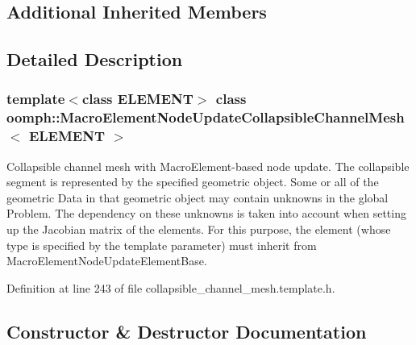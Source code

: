 \subsection*{Additional Inherited Members}


\subsection{Detailed Description}
\subsubsection*{template$<$class E\+L\+E\+M\+E\+NT$>$\newline
class oomph\+::\+Macro\+Element\+Node\+Update\+Collapsible\+Channel\+Mesh$<$ E\+L\+E\+M\+E\+N\+T $>$}

Collapsible channel mesh with Macro\+Element-\/based node update. The collapsible segment is represented by the specified geometric object. Some or all of the geometric Data in that geometric object may contain unknowns in the global Problem. The dependency on these unknowns is taken into account when setting up the Jacobian matrix of the elements. For this purpose, the element (whose type is specified by the template parameter) must inherit from Macro\+Element\+Node\+Update\+Element\+Base. 

Definition at line 243 of file collapsible\+\_\+channel\+\_\+mesh.\+template.\+h.



\subsection{Constructor \& Destructor Documentation}
\mbox{\label{classoomph_1_1MacroElementNodeUpdateCollapsibleChannelMesh_a5b7f150c4569c8d59d8220980a84cac5}} 
